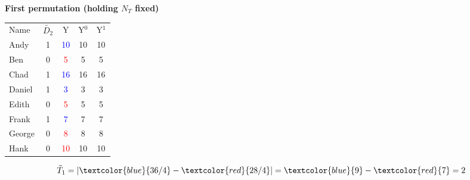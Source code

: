 \documentclass[notes=show]{beamer}
\begin{document}





\begin{frame}[plain]

\begin{center}
\textbf{First permutation (holding $N_T$ fixed)}
\end{center}

\begin{table}[htbp]\centering
\begin{center}
\begin{threeparttable}
\begin{tabular}{lcccc}
\toprule
\multicolumn{1}{l}{Name}&
\multicolumn{1}{c}{$\tilde{D_2}$}&
\multicolumn{1}{c}{Y}&
\multicolumn{1}{c}{Y$^0$}&
\multicolumn{1}{c}{Y$^1$}\\
Andy		& 1 & \textcolor{blue}{10}  & {10} & 10 \\
Ben		& 0 & \textcolor{red}{5}    & {5} & 5 \\
Chad	& 1 & \textcolor{blue}{16}  & {16} & 16 \\	
Daniel	& 1 &  \textcolor{blue}{3}   & {3} & 3 \\
Edith		& 0 & \textcolor{red}{5}    & 5 & {5} \\
Frank	& 1 & \textcolor{blue}{7}    & 7& {7}  \\
George	& 0 & \textcolor{red}{8}    & 8 & {8} \\
Hank		& 0 & \textcolor{red}{10}  & 10 & {10} \\
\bottomrule
\end{tabular}
\end{threeparttable}
\end{center}
\end{table}

$$\tilde{T}_1 =  | \textcolor{blue}{36/4} - \textcolor{red}{28/4}  | = \textcolor{blue}{9} - \textcolor{red}{7} = 2$$
	
\end{frame}
\end{document}
